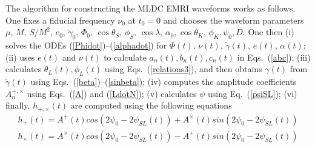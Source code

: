 \documentclass[12pt]{iopart}
\begin{document}
The algorithm for constructing the MLDC EMRI waveforms works as follows. One fixes a fiducial frequency $\nu_0$ at $t_0 = 0$ and chooses the waveform parameters $\mu,\, M,\,S/M^2,\,e_0,\,\tilde\gamma_0,\,\Phi_0,\,\cos\theta_S,\,\phi_S,\,\cos\lambda,\,\alpha_0,\cos\theta_K,\,\phi_K,\psi_0,D$. One then (i) solves the ODEs (\ref{Phidot})--(\ref{alphadot}) for $\Phi(t)$, $\nu(t)$, $\tilde\gamma(t)$, $e(t)$, $\alpha(t)$; (ii) uses $e(t)$ and $\nu(t)$ to calculate $a_n(t), b_n(t), c_n(t)$ in Eqs.~(\ref{abc}); (iii) calculates $\theta_L(t),\phi_L(t)$ using Eqs.~(\ref{relations3}), and then obtains $\gamma(t)$ from $\tilde\gamma(t)$ using Eqs.~(\ref{beta})--(\ref{sinbeta}); (iv) computes the amplitude coefficients $A_n^{+,\times}$  using Eqs.~(\ref{A}) and (\ref{LdotN}); (v) calculates $\psi$ using Eq.~(\ref{psiSL}); (vi) finally,  $h_{+,\times}(t)$ are computed using the following equations
\begin{eqnarray}\label{final}
h_+(t) = A^+(t) cos(2\psi_0 - 2\psi_{SL}(t) ) + A^{\times}(t) sin(2\psi_0 - 2\psi_{SL}(t) ) \nonumber \\
h_{\times}(t) = A^{\times}(t) cos(2\psi_0 - 2\psi_{SL}(t) ) - A^+(t) sin(2\psi_0 - 2\psi_{SL}(t) )
\end{eqnarray}
\end{document}
